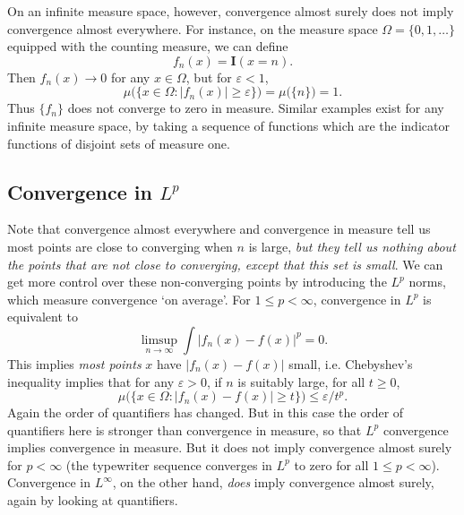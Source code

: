 \documentclass[answers]{exam}
\theoremstyle{problemstyle}
\newcommand{\1}[1]{\textbf{1}_{\left[#1\right]}} %
\begin{document}
On an infinite measure space, however, convergence almost surely does not imply convergence almost everywhere. For instance, on the measure space $\Omega = \{ 0, 1, \dots \}$ equipped with the counting measure, we can define
%
\[ f_n(x) = \mathbf{I}(x = n). \]
%
Then $f_n(x) \to 0$ for any $x \in \Omega$, but for $\varepsilon < 1$,
%
\[ \mu \Big( \{ x \in \Omega: |f_n(x)| \geq \varepsilon \} \Big) = \mu \Big( \{ n \} \Big) = 1. \]
%
Thus $\{ f_n \}$ does not converge to zero in measure. Similar examples exist for any infinite measure space, by taking a sequence of functions which are the indicator functions of disjoint sets of measure one.

\subsection*{Convergence in $L^p$}

Note that convergence almost everywhere and convergence in measure tell us most points are close to converging when $n$ is large, \emph{but they tell us nothing about the points that are not close to converging, except that this set is small}. We can get more control over these non-converging points by introducing the $L^p$ norms, which measure convergence `on average'. For $1 \leq p < \infty$, convergence in $L^p$ is equivalent to
%
\[ \limsup_{n \to \infty} \int |f_n(x) - f(x)|^p = 0. \]
%
This implies \emph{most points} $x$ have $|f_n(x) - f(x)|$ small, i.e. Chebyshev's inequality implies that for any $\varepsilon > 0$, if $n$ is suitably large, for all $t \geq 0$,
%
\[ \mu \Big( \{ x \in \Omega : |f_n(x) - f(x)| \geq t \} \Big) \leq \varepsilon / t^p. \]
%
Again the order of quantifiers has changed. But in this case the order of quantifiers here is stronger than convergence in measure, so that $L^p$ convergence implies convergence in measure. But it does not imply convergence almost surely for $p < \infty$ (the typewriter sequence converges in $L^p$ to zero for all $1 \leq p < \infty$). Convergence in $L^\infty$, on the other hand, \emph{does} imply convergence almost surely, again by looking at quantifiers.
\end{document}
